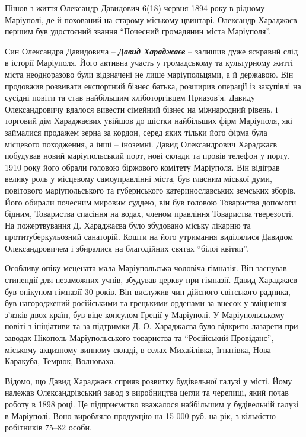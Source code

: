 Пішов з життя Олександр Давидович 6(18) червня 1894 року в рідному Маріуполі,
де й похований на старому міському цвинтарі. Олександр Хараджаєв першим був
удостоєний звання \enquote{Почесний громадянин міста Маріуполя}. 

Син Олександра Давидовича – \emph{\textbf{Давид Хараджаєв}} – залишив дуже яскравий слід в
історії Маріуполя. Його активна участь у громадському та культурному житті
міста неодноразово були відзначені не лише маріупольцями, а й державою. Він
продовжив розвивати експортний бізнес батька, розширив операції із закупівлі на
сусідні повіти та став найбільшим хліботоргівцем Приазов’я. Давиду
Олександровичу вдалося вивести сімейний бізнес на міжнародний рівень, і
торговий дім Хараджаєвих увійшов до шістки найбільших фірм Маріуполя, які
займалися продажем зерна за кордон, серед яких тільки його фірма була місцевого
походження, а інші – іноземні. Давид Олександрович Хараджаєв побудував новий
маріупольський порт, нові склади та провів телефон у порту. 1910 року його
обрали головою біржового комітету Маріуполя. Він відіграв велику роль у
місцевому самоуправлінні міста, був гласним міської думи, повітового
маріупольського та губернського катеринославських земських зборів. Його обирали
почесним мировим суддею, він був головою Товариства допомоги бідним, Товариства
спасіння на водах, членом правління Товариства тверезості. На пожертвування Д.
Хараджаєва було збудовано міську лікарню та протитуберкульозний санаторій.
Кошти на його утримання виділялися Давидом Олександровичем і збиралися на
благодійних святах \enquote{білої квітки}.

Особливу опіку мецената мала Маріупольська чоловіча гімназія. Він заснував
стипендії для незаможних учнів, збудував  церкву при гімназії. Давид Хараджаєв
був опікуном гімназії 30 років. Він вислужив чин дійсного світського радника,
був нагороджений російськими та грецькими орденами за внесок у зміцнення
з'язків двох країн, був віце-консулом Греції у Маріуполі. У Маріупольському
повіті з ініціативи та за підтримки Д. О. Хараджаєва було відкрито лазарети при
заводах Нікополь-Маріупольського товариства та \enquote{Російський Провіданс}, міському
акцизному винному складі, в селах Михайлівка, Ігнатівка, Нова Каракуба, Темрюк,
Волноваха.


Відомо, що Давид Хараджаєв сприяв розвитку будівельної галузі у місті. Йому
належав Олександрівський завод з виробництва цегли та черепиці, який почав
роботу в 1898 році. Це підприємство вважалося найбільшим у будівельній галузі в
Маріуполі. Воно виробляло продукцію на 15 000 руб. на рік, з кількістю
робітників 75–82 особи.

